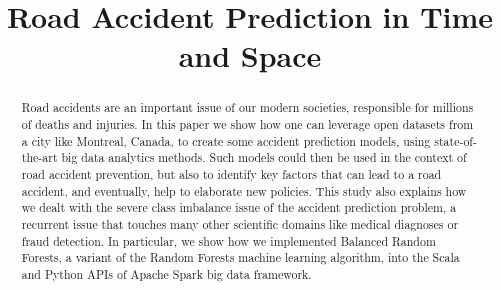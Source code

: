 \documentclass[conference]{IEEEtran}
\begin{document}
\title{Road Accident Prediction in Time and Space}

\author{
\and
{}
\and
{}
\and
{}
}

\maketitle

\begin{abstract}
Road accidents are an important issue of our modern societies, responsible for millions of deaths and injuries.
In this paper we show how one can leverage open datasets from a city like Montreal, Canada, to create some accident prediction models, using state-of-the-art big data analytics methods.
Such models could then be used in the context of road accident prevention, but also to identify key factors that can lead to a road accident, and eventually, help to elaborate new policies.
This study also explains how we dealt with the severe class imbalance issue of the accident prediction problem, a recurrent issue that touches many other scientific domains like medical diagnoses or fraud detection.
In particular, we show how we implemented Balanced Random Forests, a variant of the Random Forests machine learning algorithm, into the Scala and Python APIs of Apache Spark big data framework.

\end{abstract}
\end{document}
